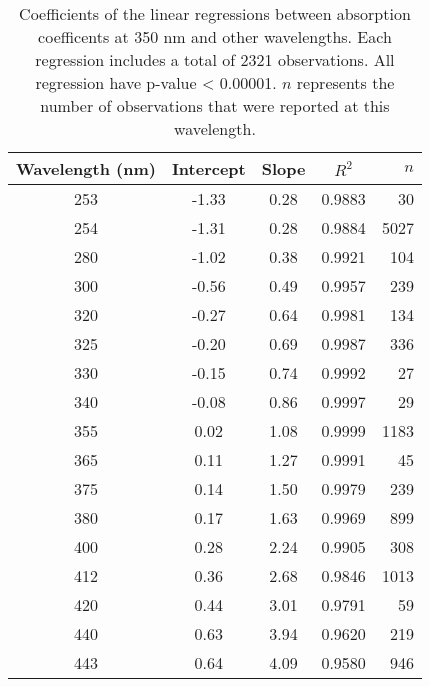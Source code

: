 \begin{table}[ht]
\centering
\begin{tabular}{ccccr}
  \hline
Wavelength (nm) & Intercept & Slope & $R^2$ & $n$ \\ 
  \hline
253 & -1.33 & 0.28 & 0.9883 & 30 \\ 
  254 & -1.31 & 0.28 & 0.9884 & 5027 \\ 
  280 & -1.02 & 0.38 & 0.9921 & 104 \\ 
  300 & -0.56 & 0.49 & 0.9957 & 239 \\ 
  320 & -0.27 & 0.64 & 0.9981 & 134 \\ 
  325 & -0.20 & 0.69 & 0.9987 & 336 \\ 
  330 & -0.15 & 0.74 & 0.9992 & 27 \\ 
  340 & -0.08 & 0.86 & 0.9997 & 29 \\ 
  355 & 0.02 & 1.08 & 0.9999 & 1183 \\ 
  365 & 0.11 & 1.27 & 0.9991 & 45 \\ 
  375 & 0.14 & 1.50 & 0.9979 & 239 \\ 
  380 & 0.17 & 1.63 & 0.9969 & 899 \\ 
  400 & 0.28 & 2.24 & 0.9905 & 308 \\ 
  412 & 0.36 & 2.68 & 0.9846 & 1013 \\ 
  420 & 0.44 & 3.01 & 0.9791 & 59 \\ 
  440 & 0.63 & 3.94 & 0.9620 & 219 \\ 
  443 & 0.64 & 4.09 & 0.9580 & 946 \\ 
   \hline
\end{tabular}
\caption{Coefficients of the linear regressions between absorption 
coefficents at 350 nm and other wavelengths. Each regression includes a total 
of 2321 observations. All regression have p-value < 0.00001.  $n$ represents 
the number of observations that were reported at this wavelength.} 
\end{table}

